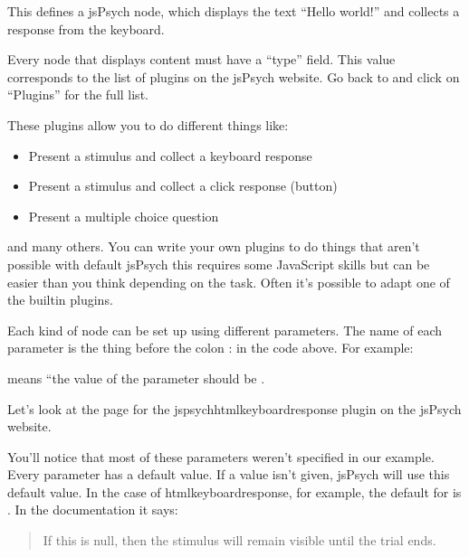 \documentclass[letterpaper,10pt,english]{sphinxmanual}
\begin{document}
This defines a jsPsych node, which displays the text “Hello world!” and collects
a response from the keyboard.

Every node that displays content must have a “type” field. This value
corresponds to the list of plugins on the jsPsych website. Go back to
 and click on “Plugins” for
the full list.

These plugins allow you to do different things like:
\begin{itemize}
\item {} 
Present a stimulus and collect a keyboard response

\item {} 
Present a stimulus and collect a click response (button)

\item {} 
Present a multiple choice question

\end{itemize}

and many others. You can write your own plugins to
do things that aren’t possible with default jsPsych \textendash{} this requires some
JavaScript skills but can be easier than you think depending on the task.
Often it’s possible to adapt one of the built\sphinxhyphen{}in plugins.

Each kind of node can be set up using different parameters. The name of each parameter is
the thing before the colon : in the code above. For example:


means “the value of the  parameter should be .

Let’s look at the page for the jspsych\sphinxhyphen{}html\sphinxhyphen{}keyboard\sphinxhyphen{}response plugin on the
jsPsych website.

You’ll notice that most of these parameters weren’t specified in our example.
Every parameter has a default value. If a value isn’t given, jsPsych will use
this default value. In the case of html\sphinxhyphen{}keyboard\sphinxhyphen{}response, for example, the default
for  is . In the documentation it says:
\begin{quote}

If this is null, then the stimulus will remain visible until the trial ends.
\end{quote}
\end{document}
